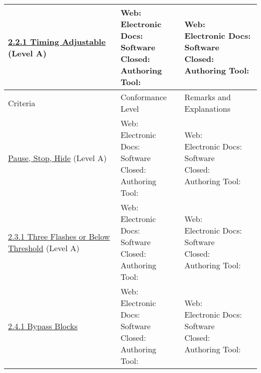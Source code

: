 \documentclass[a4paper]{report}
\begin{document}
\begin{longtable}{|l|l|l|}
        \href{http://www.w3.org/TR/WCAG20/#time-limits-required-behaviors}{2.2.1 Timing Adjustable} (Level A) & \makecell{Web: \\ Electronic Docs: \\ Software \\ Closed: \\ Authoring Tool:} & \makecell{Web: \\ Electronic Docs: \\ Software \\ Closed: \\ Authoring Tool:}\\
        \hline \newpage \hline
        Criteria & Conformance Level & Remarks and Explanations \\
        \hline
        \href{http://www.w3.org/TR/WCAG20/#time-limits-pause}{Pause, Stop, Hide} (Level A) & \makecell{Web: \\ Electronic Docs: \\ Software \\ Closed: \\ Authoring Tool:} & \makecell{Web: \\ Electronic Docs: \\ Software \\ Closed: \\ Authoring Tool:}\\
        \hline
        \href{http://www.w3.org/TR/WCAG20/#seizure-does-not-violate}{2.3.1 Three Flashes or Below Threshold} (Level A) & \makecell{Web: \\ Electronic Docs: \\ Software \\ Closed: \\ Authoring Tool:} & \makecell{Web: \\ Electronic Docs: \\ Software \\ Closed: \\ Authoring Tool:}\\
        \hline
        \href{http://www.w3.org/TR/WCAG20/#navigation-mechanisms-skip}{2.4.1 Bypass Blocks} & \makecell{Web: \\ Electronic Docs: \\ Software \\ Closed: \\ Authoring Tool:} & \makecell{Web: \\ Electronic Docs: \\ Software \\ Closed: \\ Authoring Tool:}\\

\end{longtable}
\end{document}
